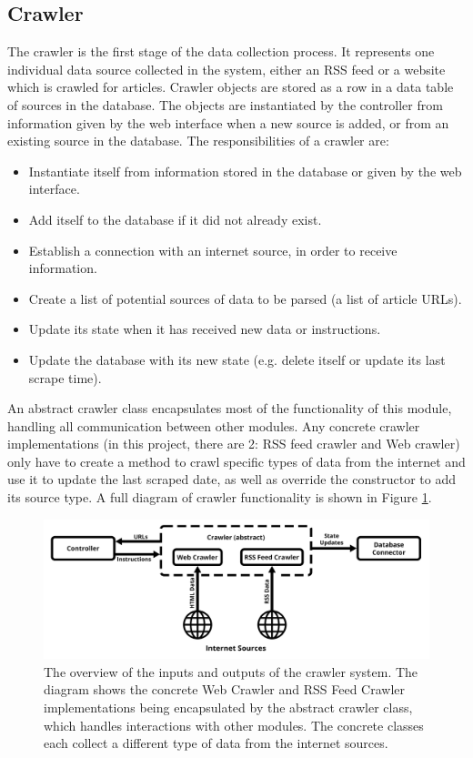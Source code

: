 \documentclass{l4proj}
\begin{document}
\subsection{Crawler}
The crawler is the first stage of the data collection process. It represents one individual data source collected in the system, either an RSS feed or a website which is crawled for articles. Crawler objects are stored as a row in a data table of sources in the database. The objects are instantiated by the controller from information given by the web interface when a new source is added, or from an existing source in the database. The responsibilities of a crawler are:
\begin{itemize}
    \item Instantiate itself from information stored in the database or given by the web interface.
    \item Add itself to the database if it did not already exist.
    \item Establish a connection with an internet source, in order to receive information.
    \item Create a list of potential sources of data to be parsed (a list of article URLs).
    \item Update its state when it has received new data or instructions.
    \item Update the database with its new state (e.g. delete itself or update its last scrape time).
\end{itemize}
An abstract crawler class encapsulates most of the functionality of this module, handling all communication between other modules. Any concrete crawler implementations (in this project, there are 2: RSS feed crawler and Web crawler) only have to create a method to crawl specific types of data from the internet and use it to update the last scraped date, as well as override the constructor to add its source type. A full diagram of crawler functionality is shown in Figure \ref{fig:crawler_diagram}.
 \begin{figure}[h]
\centering
\includegraphics[width=\textwidth]{images/Crawler-diagram.png}
\caption{The overview of the inputs and outputs of the crawler system. The diagram shows the concrete Web Crawler and RSS Feed Crawler implementations being encapsulated by the abstract crawler class, which handles interactions with other modules. The concrete classes each collect a different type of data from the internet sources.}
\label{fig:crawler_diagram}
\end{figure}
\end{document}
